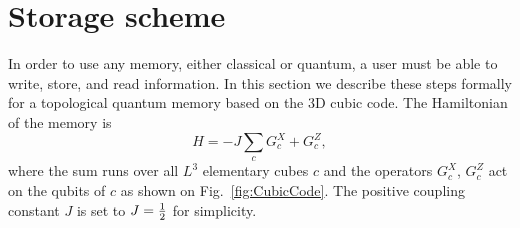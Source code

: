 \section{Storage scheme}

In order to use any memory, either classical or quantum,
a user must be able to write, store, and read information.
In this section we describe these steps
formally for a topological quantum memory based on the 3D cubic code.
The Hamiltonian of the memory is
\begin{equation*}
H=-J \sum_{c} G^X_c + G^Z_c,
\end{equation*}
where the sum runs over all $L^3$ elementary cubes $c$ and the operators $G^X_c$, $G^Z_c$
act on the qubits of $c$ as shown on Fig.~\ref{fig:CubicCode}.
The positive coupling constant $J$ is set to $J=\frac{1}{2}$ for simplicity.


